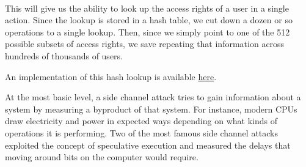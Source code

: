  \\

This will give us the ability to look up the access rights of a user in a single action. Since the lookup is stored in a hash table, we cut down a dozen or so operations to a single lookup. Then, since we simply point to one of the 512 possible subsets of access rights, we save repeating that information across hundreds of thousands of users. \\


An implementation of this hash lookup is available \href{http://github.com/andey-robins/go-hash-acl}{here}. \\


At the most basic level, a side channel attack tries to gain information about a system by measuring a byproduct of that system. For instance, modern CPUs draw electricity and power in expected ways depending on what kinds of operations it is performing. Two of the most famous side channel attacks exploited the concept of speculative execution and measured the delays that moving around bits on the computer would require. \\

